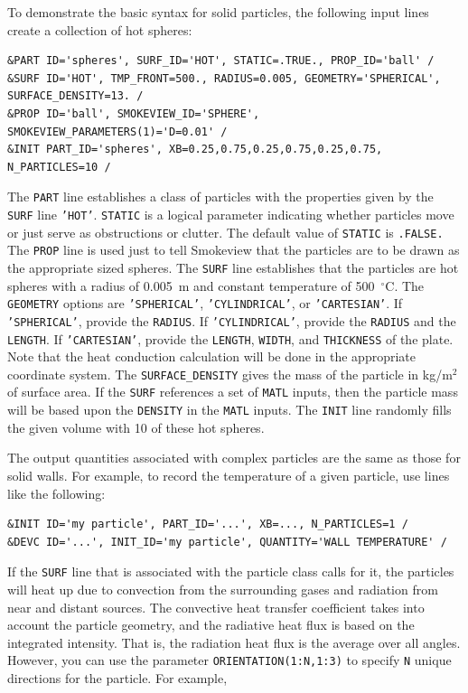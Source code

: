 \documentclass[11pt]{book}
\newcommand{\ct}{\tt\small}
\begin{document}
To demonstrate the basic syntax for solid particles, the following input lines create a collection of hot spheres:

\footnotesize
\begin{verbatim}
&PART ID='spheres', SURF_ID='HOT', STATIC=.TRUE., PROP_ID='ball' /
&SURF ID='HOT', TMP_FRONT=500., RADIUS=0.005, GEOMETRY='SPHERICAL', SURFACE_DENSITY=13. /
&PROP ID='ball', SMOKEVIEW_ID='SPHERE', SMOKEVIEW_PARAMETERS(1)='D=0.01' /
&INIT PART_ID='spheres', XB=0.25,0.75,0.25,0.75,0.25,0.75, N_PARTICLES=10 /
\end{verbatim}
\normalsize

\noindent
The {\ct PART} line establishes a class of particles with the properties given by the {\ct SURF} line {\ct 'HOT'}. {\ct STATIC} is a logical parameter indicating whether particles move or just serve as obstructions or clutter. The default value of {\ct STATIC} is {\ct .FALSE.} The {\ct PROP} line is used just to tell Smokeview that the particles are to be drawn as the appropriate sized spheres.
The {\ct SURF} line establishes that the particles are hot spheres with a radius of 0.005~m and constant temperature of 500~$^\circ$C.
The {\ct GEOMETRY} options are {\ct 'SPHERICAL'}, {\ct 'CYLINDRICAL'}, or {\ct 'CARTESIAN'}. If
{\ct 'SPHERICAL'}, provide the {\ct RADIUS}. If {\ct 'CYLINDRICAL'}, provide the {\ct RADIUS} and the {\ct LENGTH}. If {\ct 'CARTESIAN'}, provide
the {\ct LENGTH}, {\ct WIDTH}, and {\ct THICKNESS} of the plate. Note that the heat conduction calculation will be done in the appropriate coordinate
system.  The {\ct SURFACE\_DENSITY} gives the mass of the particle in kg/m$^2$ of surface area.  If the {\ct SURF} references a set of {\ct MATL} inputs, then the particle mass will be based upon the {\ct DENSITY} in the {\ct MATL} inputs.
The {\ct INIT} line randomly fills the given volume with 10 of these hot spheres.

The output quantities associated with complex particles are the same as those for solid walls. For example, to record the temperature of a given
particle, use lines like the following:

\footnotesize
\begin{verbatim}
&INIT ID='my particle', PART_ID='...', XB=..., N_PARTICLES=1 /
&DEVC ID='...', INIT_ID='my particle', QUANTITY='WALL TEMPERATURE' /
\end{verbatim}
\normalsize

\noindent
If the {\ct SURF} line that is associated with the particle class calls for it, the particles will heat up due to convection from the surrounding gases and radiation from near and distant sources. The convective heat transfer coefficient takes into account the particle geometry, and the radiative heat flux is based on the integrated intensity. That is, the radiation heat flux is the average over all angles. However, you can use the parameter {\ct ORIENTATION(1:N,1:3)} to specify {\ct N} unique directions for the particle. For example,
\end{document}
